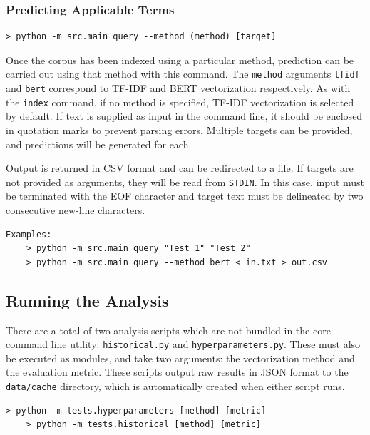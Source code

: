 \documentclass[11pt]{article}
\theoremstyle{plain}
\theoremstyle{definition}
\begin{document}
\subsubsection{Predicting Applicable Terms}\label{sec:manual-cli-query}

\begin{Verbatim}[frame=single, fontsize=\small]
    > python -m src.main query --method (method) [target]
\end{Verbatim}

Once the corpus has been indexed using a particular method, prediction can be carried out using that method with this command. The \verb|method| arguments \verb|tfidf| and \verb|bert| correspond to TF-IDF and BERT vectorization respectively.  As with the \verb|index| command, if no method is specified, TF-IDF vectorization is selected by default. If text is supplied as input in the command line, it should be enclosed in quotation marks to prevent parsing errors. Multiple targets can be provided, and predictions will be generated for each.

Output is returned in CSV format and can be redirected to a file. If targets are not provided as arguments, they will be read from \verb|STDIN|. In this case, input must be terminated with the EOF character and target text must be delineated by two consecutive new-line characters.

\begin{Verbatim}[frame=single, fontsize=\small]
    Examples:
    > python -m src.main query "Test 1" "Test 2"
    > python -m src.main query --method bert < in.txt > out.csv
\end{Verbatim}

\subsection{Running the Analysis}\label{sec:manual-analysis}

There are a total of two analysis scripts which are not bundled in the core command line utility: \verb|historical.py| and \verb|hyperparameters.py|. These must also be executed as modules, and take two arguments: the vectorization method and the evaluation metric. These scripts output raw results in JSON format to the \verb|data/cache| directory, which is automatically created when either script runs.

\begin{Verbatim}[frame=single, fontsize=\small]
    > python -m tests.hyperparameters [method] [metric]
    > python -m tests.historical [method] [metric]
\end{Verbatim}
\end{document}
